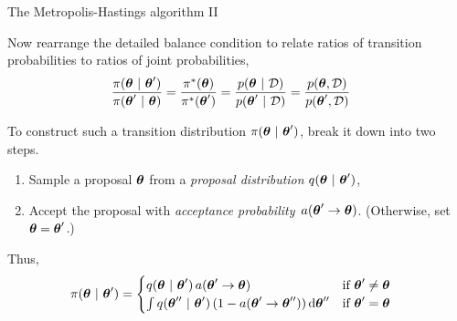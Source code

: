 \documentclass[aspectratio=169]{beamer}
\begin{document}
\begin{frame}{The Metropolis-Hastings algorithm II}
    
Now rearrange the detailed balance condition to relate ratios of transition probabilities to ratios of joint probabilities,
\begin{align}
    \label{eq:transition_constraint}
    \frac{\pi(\boldsymbol{\theta} ~\vert~ \boldsymbol{\theta}')}{\pi(\boldsymbol{\theta}' ~\vert~ \boldsymbol{\theta})}
    &= 
    \frac{\pi^*(\boldsymbol{\theta})}{\pi^*(\boldsymbol{\theta}')}
    = 
    \frac{p(\boldsymbol{\theta} ~\vert~ \mathcal{D})}{p(\boldsymbol{\theta}' ~\vert~ \mathcal{D})}
    = 
    \frac{p(\boldsymbol{\theta}, \mathcal{D})}{p(\boldsymbol{\theta}',  \mathcal{D})}
\end{align}

To construct such a transition distribution $\pi(\boldsymbol{\theta} ~\vert~ \boldsymbol{\theta}')$, break it down into two steps. 
\begin{enumerate}
    \item Sample a proposal $\boldsymbol{\theta}$ from a \emph{proposal distribution} $q(\boldsymbol{\theta} ~\vert~ \boldsymbol{\theta}')$,
    \item Accept the proposal with \emph{acceptance probability}~$a(\boldsymbol{\theta}' \to \boldsymbol{\theta})$. (Otherwise, set $\boldsymbol{\theta} = \boldsymbol{\theta}'$.)
\end{enumerate}

Thus,
\begin{align}
    \pi(\boldsymbol{\theta} ~\vert~ \boldsymbol{\theta}') &= 
    \begin{cases}
    q(\boldsymbol{\theta} ~\vert~ \boldsymbol{\theta}') \, a(\boldsymbol{\theta}' \to \boldsymbol{\theta}) & \text{if } \boldsymbol{\theta}' \neq \boldsymbol{\theta} \\
    \int q(\boldsymbol{\theta}'' ~\vert~ \boldsymbol{\theta}') \, (1 - a(\boldsymbol{\theta}' \to \boldsymbol{\theta}'')) \mathop{}\!\mathrm{d} \boldsymbol{\theta}'' & \text{if } \boldsymbol{\theta}' = \boldsymbol{\theta}
    \end{cases}
\end{align}

\end{frame}
\end{document}
